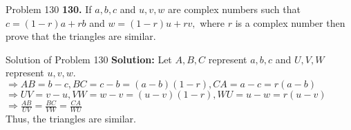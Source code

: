 \documentclass[aspectratio=169,8pt]{beamer}
\begin{document}
\begin{frame}{Problem 130}
  \textbf{130.} If $a, b, c$ and $u, v, w$ are complex numbers such that $c = (1 - r)a + rb$ and $w = (1 - r)u + rv,$ where $r$ is
  a complex number then prove that the triangles are similar.
\end{frame}
\begin{frame}{Solution of Problem 130}
  \textbf{Solution:} Let $A, B, C$ represent $a,b,c$ and $U, V, W$ represent $u, v, w.$\\
  \vspace*{0.2cm}
  $\Rightarrow AB = b - c, BC = c - b = (a - b)(1 - r), CA = a - c = r(a - b)$\\
  \vspace*{0.2cm}
  $\Rightarrow UV = v - u, VW = w - v = (u - v)(1 - r), WU = u - w = r(u - v)$\\
  \vspace*{0.2cm}
  $\Rightarrow \frac{AB}{UV} = \frac{BC}{VW} = \frac{CA}{WU}$\\
  \vspace*{0.2cm}
  Thus, the triangles are similar.
\end{frame}
\end{document}
